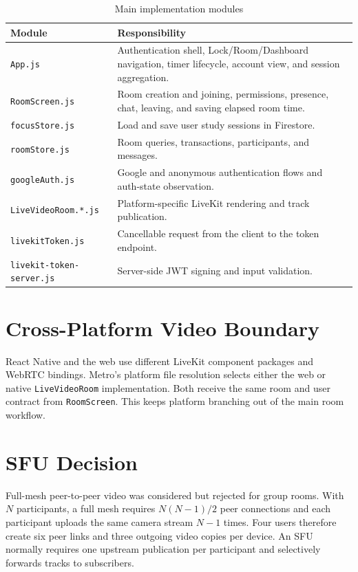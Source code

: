 \begin{table}[H]
\centering
\small
\begin{tabularx}{\textwidth}{|p{}|X|}
\hline
\textbf{Module} & \textbf{Responsibility} \\ \hline
\texttt{App.js} & Authentication shell, Lock/Room/Dashboard navigation, timer lifecycle, account view, and session aggregation. \\ \hline
\texttt{RoomScreen.js} & Room creation and joining, permissions, presence, chat, leaving, and saving elapsed room time. \\ \hline
\texttt{focusStore.js} & Load and save user study sessions in Firestore. \\ \hline
\texttt{roomStore.js} & Room queries, transactions, participants, and messages. \\ \hline
\texttt{googleAuth.js} & Google and anonymous authentication flows and auth-state observation. \\ \hline
\texttt{LiveVideoRoom.*.js} & Platform-specific LiveKit rendering and track publication. \\ \hline
\texttt{livekitToken.js} & Cancellable request from the client to the token endpoint. \\ \hline
\texttt{livekit-token-server.js} & Server-side JWT signing and input validation. \\ \hline
\end{tabularx}
\caption{Main implementation modules}
\label{tab:modules}
\end{table}

\section{Cross-Platform Video Boundary}
React Native and the web use different LiveKit component packages and WebRTC bindings. Metro's platform file resolution selects either the web or native \texttt{LiveVideoRoom} implementation. Both receive the same room and user contract from \texttt{RoomScreen}. This keeps platform branching out of the main room workflow.

\section{SFU Decision}
Full-mesh peer-to-peer video was considered but rejected for group rooms. With $N$ participants, a full mesh requires $N(N-1)/2$ peer connections and each participant uploads the same camera stream $N-1$ times. Four users therefore create six peer links and three outgoing video copies per device. An SFU normally requires one upstream publication per participant and selectively forwards tracks to subscribers.

